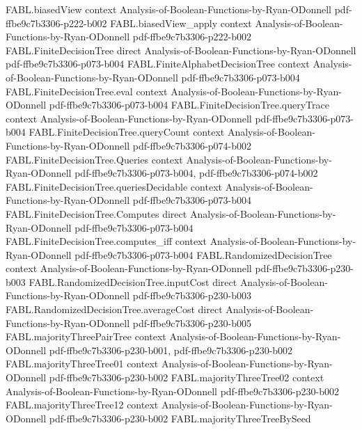 \begin{theorem}
\proofstep
  {FABL.biasedView}
  {context}
  {Analysis-of-Boolean-Functions-by-Ryan-ODonnell}
  {pdf-ffbe9c7b3306-p222-b002}
\proofstep
  {FABL.biasedView_apply}
  {context}
  {Analysis-of-Boolean-Functions-by-Ryan-ODonnell}
  {pdf-ffbe9c7b3306-p222-b002}
\proofstep
  {FABL.FiniteDecisionTree}
  {direct}
  {Analysis-of-Boolean-Functions-by-Ryan-ODonnell}
  {pdf-ffbe9c7b3306-p073-b004}
\proofstep
  {FABL.FiniteAlphabetDecisionTree}
  {context}
  {Analysis-of-Boolean-Functions-by-Ryan-ODonnell}
  {pdf-ffbe9c7b3306-p073-b004}
\proofstep
  {FABL.FiniteDecisionTree.eval}
  {context}
  {Analysis-of-Boolean-Functions-by-Ryan-ODonnell}
  {pdf-ffbe9c7b3306-p073-b004}
\proofstep
  {FABL.FiniteDecisionTree.queryTrace}
  {context}
  {Analysis-of-Boolean-Functions-by-Ryan-ODonnell}
  {pdf-ffbe9c7b3306-p073-b004}
\proofstep
  {FABL.FiniteDecisionTree.queryCount}
  {context}
  {Analysis-of-Boolean-Functions-by-Ryan-ODonnell}
  {pdf-ffbe9c7b3306-p074-b002}
\proofstep
  {FABL.FiniteDecisionTree.Queries}
  {context}
  {Analysis-of-Boolean-Functions-by-Ryan-ODonnell}
  {pdf-ffbe9c7b3306-p073-b004,
    pdf-ffbe9c7b3306-p074-b002}
\proofstep
  {FABL.FiniteDecisionTree.queriesDecidable}
  {context}
  {Analysis-of-Boolean-Functions-by-Ryan-ODonnell}
  {pdf-ffbe9c7b3306-p073-b004}
\proofstep
  {FABL.FiniteDecisionTree.Computes}
  {direct}
  {Analysis-of-Boolean-Functions-by-Ryan-ODonnell}
  {pdf-ffbe9c7b3306-p073-b004}
\proofstep
  {FABL.FiniteDecisionTree.computes_iff}
  {context}
  {Analysis-of-Boolean-Functions-by-Ryan-ODonnell}
  {pdf-ffbe9c7b3306-p073-b004}
\proofstep
  {FABL.RandomizedDecisionTree}
  {context}
  {Analysis-of-Boolean-Functions-by-Ryan-ODonnell}
  {pdf-ffbe9c7b3306-p230-b003}
\proofstep
  {FABL.RandomizedDecisionTree.inputCost}
  {direct}
  {Analysis-of-Boolean-Functions-by-Ryan-ODonnell}
  {pdf-ffbe9c7b3306-p230-b003}
\proofstep
  {FABL.RandomizedDecisionTree.averageCost}
  {direct}
  {Analysis-of-Boolean-Functions-by-Ryan-ODonnell}
  {pdf-ffbe9c7b3306-p230-b005}
\proofstep
  {FABL.majorityThreePairTree}
  {context}
  {Analysis-of-Boolean-Functions-by-Ryan-ODonnell}
  {pdf-ffbe9c7b3306-p230-b001,
    pdf-ffbe9c7b3306-p230-b002}
\proofstep
  {FABL.majorityThreeTree01}
  {context}
  {Analysis-of-Boolean-Functions-by-Ryan-ODonnell}
  {pdf-ffbe9c7b3306-p230-b002}
\proofstep
  {FABL.majorityThreeTree02}
  {context}
  {Analysis-of-Boolean-Functions-by-Ryan-ODonnell}
  {pdf-ffbe9c7b3306-p230-b002}
\proofstep
  {FABL.majorityThreeTree12}
  {context}
  {Analysis-of-Boolean-Functions-by-Ryan-ODonnell}
  {pdf-ffbe9c7b3306-p230-b002}
\proofstep
  {FABL.majorityThreeTreeBySeed}

\end{theorem}
